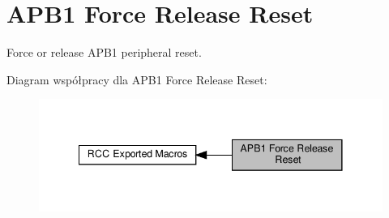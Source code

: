 \hypertarget{group___r_c_c___a_p_b1___force___release___reset}{}\section{A\+P\+B1 Force Release Reset}
\label{group___r_c_c___a_p_b1___force___release___reset}


Force or release A\+P\+B1 peripheral reset.  


Diagram współpracy dla A\+P\+B1 Force Release Reset\+:\nopagebreak
\begin{figure}[H]
\begin{center}
\leavevmode
\includegraphics[width=341pt]{group___r_c_c___a_p_b1___force___release___reset}
\end{center}
\end{figure}
